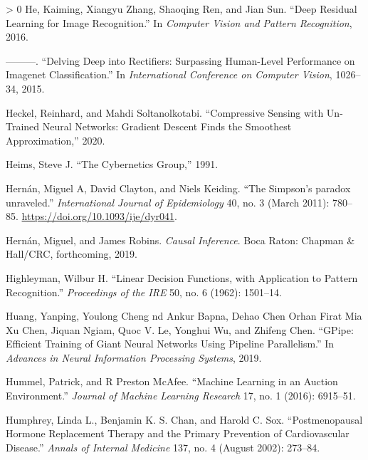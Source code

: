 \documentclass{tufte-book}
\newlength{\cslhangindent}
\newenvironment{CSLReferences}[3] %
 {%
  \setlength{\parindent}{0pt}
  \ifodd #1 \everypar{\setlength{\hangindent}{\cslhangindent}}\ignorespaces\fi
  \ifnum #2 > 0
  \setlength{\parskip}{#3\baselineskip}
  \fi
 }%
 {
 }
\begin{document}
\begin{CSLReferences}{1}{0}
\leavevmode\hypertarget{ref-resnet}{}%
He, Kaiming, Xiangyu Zhang, Shaoqing Ren, and Jian Sun. {``Deep Residual
Learning for Image Recognition.''} In \emph{Computer Vision and Pattern
Recognition}, 2016.

\leavevmode\hypertarget{ref-he2015delving}{}%
---------. {``Delving Deep into Rectifiers: Surpassing Human-Level
Performance on Imagenet Classification.''} In \emph{International
Conference on Computer Vision}, 1026--34, 2015.

\leavevmode\hypertarget{ref-heckel2020compressive}{}%
Heckel, Reinhard, and Mahdi Soltanolkotabi. {``Compressive Sensing with
Un-Trained Neural Networks: Gradient Descent Finds the Smoothest
Approximation,''} 2020.

\leavevmode\hypertarget{ref-heims1991cybernetics}{}%
Heims, Steve J. {``The Cybernetics Group,''} 1991.

\leavevmode\hypertarget{ref-hernan2011simpson}{}%
Hernán, Miguel A, David Clayton, and Niels Keiding. {``{The Simpson's
paradox unraveled}.''} \emph{International Journal of Epidemiology} 40,
no. 3 (March 2011): 780--85. \url{https://doi.org/10.1093/ije/dyr041}.

\leavevmode\hypertarget{ref-hernan2019causal}{}%
Hernán, Miguel, and James Robins. \emph{Causal Inference}. Boca Raton:
Chapman \& Hall/CRC, forthcoming, 2019.

\leavevmode\hypertarget{ref-highleyman1962linear}{}%
Highleyman, Wilbur H. {``Linear Decision Functions, with Application to
Pattern Recognition.''} \emph{Proceedings of the {IRE}} 50, no. 6
(1962): 1501--14.

\leavevmode\hypertarget{ref-gpipe}{}%
Huang, Yanping, Youlong Cheng nd Ankur Bapna, Dehao Chen Orhan Firat Mia
Xu Chen, Jiquan Ngiam, Quoc V. Le, Yonghui Wu, and Zhifeng Chen.
{``GPipe: Efficient Training of Giant Neural Networks Using Pipeline
Parallelism.''} In \emph{Advances in Neural Information Processing
Systems}, 2019.

\leavevmode\hypertarget{ref-hummel2016machine}{}%
Hummel, Patrick, and R Preston McAfee. {``Machine Learning in an Auction
Environment.''} \emph{Journal of Machine Learning Research} 17, no. 1
(2016): 6915--51.

\leavevmode\hypertarget{ref-humphrey2002postmenopausal}{}%
Humphrey, Linda L., Benjamin K. S. Chan, and Harold C. Sox.
{``{Postmenopausal Hormone Replacement Therapy and the Primary
Prevention of Cardiovascular Disease}.''} \emph{Annals of Internal
Medicine} 137, no. 4 (August 2002): 273--84.


\end{CSLReferences}
\end{document}
